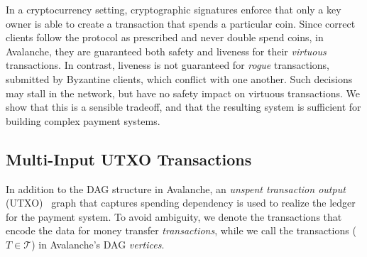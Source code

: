 \documentclass[letterpaper,twocolumn,10pt]{article}
\theoremstyle{definition}
\begin{document}
In a cryptocurrency setting, cryptographic signatures enforce that only a key owner is able to create a transaction that spends a particular coin. Since correct clients follow the protocol as prescribed and never double spend coins, in Avalanche, they are guaranteed both safety and liveness for their \emph{virtuous} transactions. In contrast, liveness is not guaranteed for \emph{rogue} transactions, submitted by Byzantine clients, which conflict with one another. Such decisions may stall in the network, but have no safety impact on virtuous transactions.
We show that this is a sensible tradeoff, and that the resulting system is sufficient for building complex payment systems.



\subsection{Multi-Input UTXO Transactions}
In addition to the DAG structure in Avalanche, an \emph{unspent transaction output} (UTXO)~\cite{nakamoto2008bitcoin} graph that captures
spending dependency is used to realize the ledger for the payment system. To
avoid ambiguity, we denote the transactions that encode the data for money
transfer \emph{transactions}, while we call the
transactions ($T \in \mathcal{T}$) in Avalanche's DAG \emph{vertices}.
\end{document}
